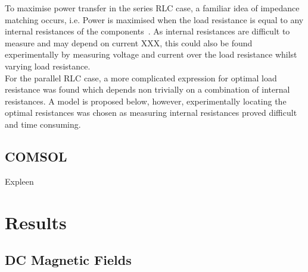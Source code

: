 \documentclass[11pt]{iopart}
\begin{document}
To maximise power transfer in the series RLC case, a familiar idea of
impedance matching occurs, i.e. Power is maximised when the load
resistance is equal to any internal resistances of the
components~\cite{XXX}. As internal resistances are difficult to
measure and may depend on current XXX, this could also be found experimentally
by measuring voltage and current over the load resistance whilst
varying load resistance. \\
For the parallel RLC case, a more complicated expression for optimal
load resistance was found which depends non trivially on a combination
of internal resistances. A model is proposed below, however,
experimentally locating the optimal resistances was chosen as
measuring internal resistances proved difficult and time consuming.\\

\subsection{COMSOL}
Expleen
\section{Results}
\subsection{DC Magnetic Fields}
\begin{figure}
  \caption{}
  \label{fig:DC_graph}
\end{figure}
\end{document}
